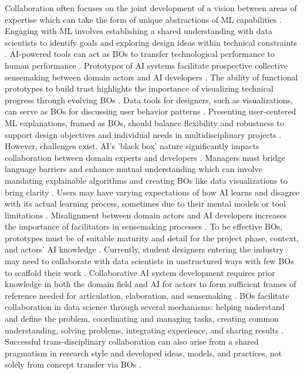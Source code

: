 \documentclass[12pt,oneside]{article}
\begin{document}
Collaboration often focuses on the joint development of a vision between areas of expertise which can take the form of unique abstractions of \ac{ML} capabilities \citep[5]{yang2018investigating}. Engaging with \ac{ML} involves establishing a shared understanding with data scientists to identify goals and exploring design ideas within technical constraints \citep[8]{yang2018investigating}. \ac{AI}-powered tools can act as \ac{BO}s to transfer technological performance to human performance \citep[1]{prentice2023artificial}. Prototypes of \ac{AI} systems facilitate prospective collective sensemaking between domain actors and \ac{AI} developers \citep[75]{särner2024prospective}. The ability of functional prototypes to build trust highlights the importance of visualizing technical progress through evolving \ac{BO}s \citep[80]{särner2024prospective}. Data tools for designers, such as visualizations, can serve as \ac{BO}s for discussing user behavior patterns \citep[9]{yang2018investigating}. Presenting user-centered \ac{ML} explanations, framed as \ac{BO}s, should balance flexibility and robustness to support design objectives and individual needs in multidisciplinary projects \citep[7]{ayobi2021machine}. \newline
However, challenges exist. \ac{AI}'s 'black box' nature significantly impacts collaboration between domain experts and developers \citep[6144]{mayer2023managing}. Managers must bridge language barriers and enhance mutual understanding which can involve mandating explainable algorithms and creating \ac{BO}s like data visualizations to bring clarity \citep[6146]{mayer2023managing}. Users may have varying expectations of how \ac{AI} learns and disagree with its actual learning process, sometimes due to their mental models or tool limitations \citep[14]{chung2023artinter}. Misalignment between domain actors and \ac{AI} developers increases the importance of facilitators in sensemaking processes \citep[79]{särner2024prospective}. To be effective \ac{BO}s, prototypes must be of suitable maturity and detail for the project phase, context, and actors' \ac{AI} knowledge \citep[81]{särner2024prospective}. Currently, student designers entering the industry may need to collaborate with data scientists in unstructured ways with few \ac{BO}s to scaffold their work \citep[8]{yang2018investigating}. \newline
Collaborative \ac{AI} system development requires prior knowledge in both the domain field and \ac{AI} for actors to form sufficient frames of reference needed for articulation, elaboration, and sensemaking \citep[79]{särner2024prospective}. \ac{BO}s facilitate collaboration in data science through several mechanisms: helping understand and define the problem, coordinating and managing tasks, creating common understanding, solving problems, integrating experience, and sharing results \citep[6-7]{rahlmeier2024bridging}. Successful trans-disciplinary collaboration can also arise from a shared pragmatism in research style and developed ideas, models, and practices, not solely from concept transfer via \ac{BO}s \citep[453, 456]{strübing1998bridging}.
\end{document}
